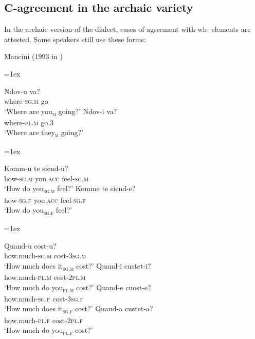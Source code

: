 \documentclass[output=paper
,modfonts
,nonflat]{langsci/langscibook}
\begin{document}
\subsection{C-agreement in the archaic variety}\label{sec-dalessandro:4.6}
In the archaic version of the dialect, cases of agreement with wh- elements are attested. Some speakers still use these forms:

\begin{exe} 
	\ex Mancini (1993 in \citealt[4]{Ledgeway2006}) \xlist
	{\multicolsep=1ex\begin{multicols}{2}\ex 
	\gll Ndov-u   va?\\
	where-\textsc{sg.m} go\\
	\glt`Where are you\textsc{\textsubscript{m}} going?'
	\ex
	\gll   Ndov-i     va?\\
	where-\textsc{pl.m} go.3\\ 
	\glt `Where are they\textsc{\textsubscript{m}} going?'\end{multicols}}
	\endxlist
\end{exe}
\begin{exe} 
	\ex  \xlist
	{\multicolsep=1ex\begin{multicols}{2}\ex 
	\gll Komm-u   te     siend-u?\\
	how-\textsc{sg.m} you.\textsc{acc} feel-\textsc{sg.m}\\
	\glt `How do you\textsc{\textsubscript{sg.m}} feel?'
	\ex
	\gll Komme   te     siend-e? \\
	how-\textsc{sg.f} you.\textsc{acc} feel-\textsc{sg.f}\\ 
	\glt `How do you\textsc{\textsubscript{sg.f}} feel?'\end{multicols}}
	\endxlist
\end{exe}
\largerpage[-1]\pagebreak
\begin{exe} 
	\ex \citet[54]{Lambertelli2003} \xlist
	{\multicolsep=1ex\begin{multicols}{2}\ex 
	\gll Quand-u   cost-u?\\
	how.much-\textsc{sg.m}  cost-\textsc{3sg.m}\\
	\glt `How much does it\textsc{\textsubscript{sg.m}} cost?'
	\ex
	\gll Quand-i   custet-i? \\
	how.much-\textsc{pl.m}  cost-\textsc{2pl.m}\\ 
	\glt `How much do you\textsc{\textsubscript{pl.m}} cost?'
	\ex
	\gll Quand-e   cuost-e? \\
	how.much-\textsc{sg.f}  cost-\textsc{3sg.f}\\ 
	\glt `How much does it\textsc{\textsubscript{sg.f}} cost?'
	\ex
	\gll Quand-a   custet-a? \\
	how.much-\textsc{pl.f}  cost-\textsc{2pl.f}\\ 
	\glt `How much do you\textsc{\textsubscript{pl.f}} cost?'
	\end{multicols}}\endxlist
\end{exe}
\end{document}
